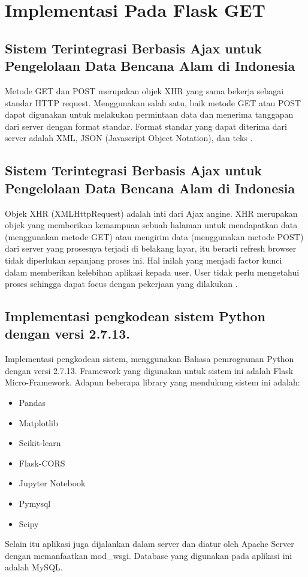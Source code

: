 \section{Implementasi Pada Flask GET}
\subsection{Sistem Terintegrasi Berbasis Ajax untuk Pengelolaan Data Bencana Alam di Indonesia}
Metode GET dan POST merupakan objek XHR yang sama bekerja sebagai standar HTTP request. Menggunakan salah satu, baik metode GET atau POST dapat digunakan untuk melakukan permintaan data dan menerima tanggapan dari server dengan format standar. Format standar yang dapat diterima dari server adalah XML, JSON (Javascript Object Notation), dan teks \cite{prasetyo2007sistem}.
\subsection{Sistem Terintegrasi Berbasis Ajax untuk Pengelolaan Data Bencana Alam di Indonesia}
Objek XHR (XMLHttpRequest) adalah inti dari Ajax angine. XHR merupakan objek yang memberikan kemampuan sebuah halaman untuk mendapatkan data (menggunakan metode GET) atau mengirim data (menggunakan metode POST) dari server yang prosesnya terjadi di belakang layar, itu berarti refresh browser tidak diperlukan sepanjang proses ini. Hal inilah yang menjadi factor kunci dalam memberikan kelebihan aplikasi kepada user. User tidak perlu mengetahui proses sehingga dapat focus dengan pekerjaan yang dilakukan \cite{prasetyo2007sistem}.
\subsection{Implementasi pengkodean sistem Python dengan versi 2.7.13.}
Implementasi pengkodean sistem, menggunakan Bahasa pemrograman Python dengan versi 2.7.13. Framework yang digunakan untuk sistem ini adalah Flask Micro-Framework. Adapun beberapa library yang mendukung sistem ini adalah: 
\begin{itemize}
\item Pandas 
\item Matplotlib 
\item Scikit-learn 
\item Flask-CORS 
\item Jupyter Notebook
\item Pymysql 
\item Scipy 
\end{itemize}
Selain itu aplikasi juga dijalankan dalam server dan diatur oleh Apache Server dengan memanfaatkan mod_wsgi. Database yang digunakan pada aplikasi ini adalah MySQL\cite{gunawan2018aplikasi}.  

